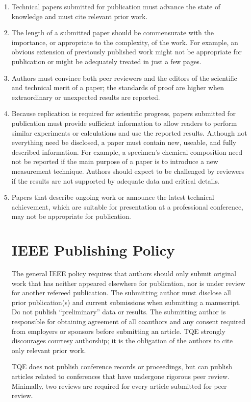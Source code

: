 \documentclass{ieeeaccess}
\begin{document}
\begin{enumerate}
    \item Technical papers submitted for publication must advance the state of knowledge and must cite relevant prior work.
    \item The length of a submitted paper should be commensurate with the importance, or appropriate to the complexity, of the work. For example, an obvious extension of previously published work might not be appropriate for publication or might be adequately treated in just a few pages.
    \item Authors must convince both peer reviewers and the editors of the scientific and technical merit of a paper; the standards of proof are higher when extraordinary or unexpected results are reported.
    \item Because replication is required for scientific progress, papers submitted for publication must provide sufficient information to allow readers to perform similar experiments or calculations and
          use the reported results. Although not everything need be disclosed, a paper
          must contain new, useable, and fully described information. For example, a
          specimen's chemical composition need not be reported if the main purpose of
          a paper is to introduce a new measurement technique. Authors should expect
          to be challenged by reviewers if the results are not supported by adequate
          data and critical details.
    \item Papers that describe ongoing work or announce the latest technical achievement,
          which are suitable for presentation at a professional conference, may not be appropriate
          for publication.

          \section{IEEE Publishing Policy}
          The general IEEE policy requires that authors should only submit original
          work that has neither appeared elsewhere for publication, nor is under
          review for another refereed publication. The submitting author must disclose
          all prior publication(s) and current submissions when submitting a
          manuscript. Do not publish ``preliminary'' data or results. The submitting
          author is responsible for obtaining agreement of all coauthors and any
          consent required from employers or sponsors before submitting an article.
          TQE strongly discourages courtesy
          authorship; it is the obligation of the authors to cite only relevant prior
          work.

          TQE does not publish conference
          records or proceedings, but can publish articles related to conferences that
          have undergone rigorous peer review. Minimally, two reviews are required for
          every article submitted for peer review.

\end{enumerate}
\end{document}
